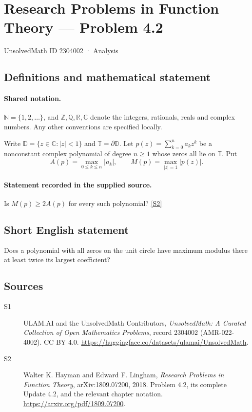 \documentclass[11pt]{book}
\newcommand{\sref}[2]{\hyperlink{source:#1:#2}{[S#2]}}
\begin{document}
\setcounter{section}{2304001}
\section{Research Problems in Function Theory — Problem 4.2}\label{2304002}
{\small\sffamily UnsolvedMath ID 2304002 · Analysis}
\subsection{Definitions and mathematical statement}

\paragraph{Shared notation.}$\mathbb N=\{1,2,\ldots\}$, and $\mathbb Z,\mathbb Q,\mathbb R,\mathbb C$ denote the integers, rationals, reals and complex numbers. Any other conventions are specified locally.


Write $\mathbb D=\{z\in\mathbb C:|z|<1\}$ and $\mathbb T=\partial\mathbb D$. Let $p(z)=\sum_{k=0}^na_kz^k$ be a nonconstant complex polynomial of degree $n\ge1$ whose zeros all lie on $\mathbb T$. Put
\[A(p)=\max_{0\le k\le n}|a_k|,\qquad M(p)=\max_{|z|=1}|p(z)|.
\]
\paragraph{Statement recorded in the supplied source.}
Is $M(p)\ge2A(p)$ for every such polynomial? \sref{2304002}{2}
\subsection{Short English statement}
Does a polynomial with all zeros on the unit circle have maximum modulus there at least twice its largest coefficient?
\subsection{Sources}
\begin{description}
\item[\hypertarget{source:2304002:1}{S1}] ULAM.AI and the UnsolvedMath Contributors, \emph{UnsolvedMath: A Curated Collection of Open Mathematics Problems}, record 2304002 (AMR-022-4002). CC BY 4.0. \url{https://huggingface.co/datasets/ulamai/UnsolvedMath}.
\item[\hypertarget{source:2304002:2}{S2}] Walter K. Hayman and Edward F. Lingham, \emph{Research Problems in Function Theory}, arXiv:1809.07200, 2018. Problem 4.2, its complete Update 4.2, and the relevant chapter notation. \url{https://arxiv.org/pdf/1809.07200}.
\end{description}
\label{end:2304002}
\end{document}
